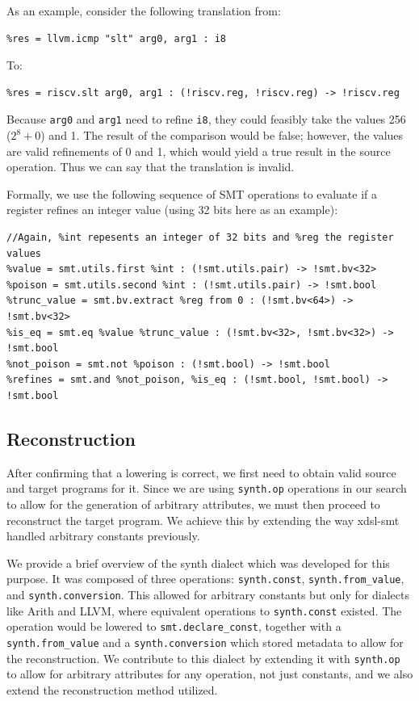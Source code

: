 As an example, consider the following translation from:
\begin{verbatim}
%res = llvm.icmp "slt" arg0, arg1 : i8 
\end{verbatim}
To:
\begin{verbatim}
%res = riscv.slt arg0, arg1 : (!riscv.reg, !riscv.reg) -> !riscv.reg
\end{verbatim}

Because \texttt{arg0} and \texttt{arg1} need to refine \texttt{i8}, they could feasibly take the
values 256 ($2^8 + 0$) and 1. The result of the comparison would be false; however, the values are
valid refinements of 0 and 1, which would yield a true result in the source operation. Thus we can say 
that the translation is invalid.

Formally, we use the following sequence of SMT operations to evaluate if a register refines an integer 
value (using 32 bits here as an example):
\begin{verbatim}
//Again, %int repesents an integer of 32 bits and %reg the register values
%value = smt.utils.first %int : (!smt.utils.pair) -> !smt.bv<32>
%poison = smt.utils.second %int : (!smt.utils.pair) -> !smt.bool
%trunc_value = smt.bv.extract %reg from 0 : (!smt.bv<64>) -> !smt.bv<32>
%is_eq = smt.eq %value %trunc_value : (!smt.bv<32>, !smt.bv<32>) -> !smt.bool
%not_poison = smt.not %poison : (!smt.bool) -> !smt.bool
%refines = smt.and %not_poison, %is_eq : (!smt.bool, !smt.bool) -> !smt.bool
\end{verbatim}

\subsection{Reconstruction}

After confirming that a lowering is correct, we first need to obtain valid source and target programs for it.
Since we are using \texttt{synth.op} operations in our search to allow for the generation of arbitrary attributes,
we must then proceed to reconstruct the target program. We achieve this by extending the way xdsl-smt 
handled arbitrary constants previously.

We provide a brief overview of the synth dialect which was developed for this purpose. 
It was composed of three operations: \texttt{synth.const}, \texttt{synth.from\_value}, and \texttt{synth.conversion}.
%
This allowed for arbitrary constants but only for dialects like Arith and LLVM, where equivalent operations to \texttt{synth.const} 
existed. The operation would be lowered to \texttt{smt.declare\_const}, 
together with a \texttt{synth.from\_value} and a \texttt{synth.conversion} 
which stored metadata to allow for the reconstruction. We contribute to this dialect by extending 
it with \texttt{synth.op} to allow for arbitrary attributes for any operation, not just constants, and
we also extend the reconstruction method utilized.

